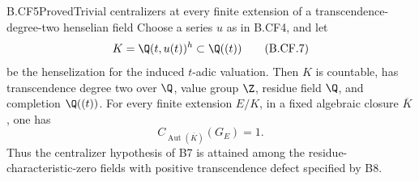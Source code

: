 \begin{claim}{B.CF5}{Proved}{Trivial centralizers at every finite extension of a transcendence-degree-two henselian field}
Choose a series \(u\) as in B.CF4, and let
\[
             K=\Q(t,u(t))^h\subset\Q((t))               \tag{B.CF.7}
\]
be the henselization for the induced \(t\)-adic valuation. Then
\(K\) is countable, has transcendence degree two over \(\Q\), value
group \(\Z\), residue field \(\Q\), and completion \(\Q((t))\).
For every finite extension \(E/K\), in a fixed algebraic closure
\(\overline K\), one has
\[
              C_{\operatorname{Aut}(\overline K)}(G_E)=1.
                                                        \tag{B.CF.8}
\]
Thus the centralizer hypothesis of B7 is attained among the
residue-characteristic-zero fields with positive transcendence defect
specified by B8.
\end{claim}
